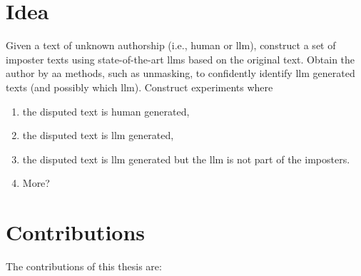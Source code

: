 \section{Idea}
\label{sec:idea}

Given a text of unknown authorship (i.e., human or \ac{llm}), 
construct a set of imposter texts using state-of-the-art \acp{llm} based on the original text.
Obtain the author by \ac{aa} methods, such as unmasking, to confidently identify \ac{llm} generated texts
(and possibly which \ac{llm}).
Construct experiments where
\begin{enumerate}
    \item the disputed text is human generated,
    \item the disputed text is \ac{llm} generated,
    \item the disputed text is \ac{llm} generated but the \ac{llm} is not part of the imposters.
    \item More?
\end{enumerate}


\section{Contributions}
\label{sec:contributions}
The contributions of this thesis are: